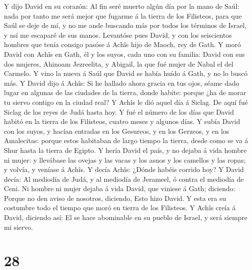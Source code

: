  Y dijo David en su corazón: Al fin seré muerto algún día
por la mano de Saúl: nada por tanto me será mejor que fugarme á la
tierra de los Filisteos, para que Saúl se deje de mí, y no me ande
buscando más por todos los términos de Israel, y así me escaparé de sus
manos.  Levantóse pues David, y con los seiscientos
hombres que tenía consigo pasóse á Achîs hijo de Maoch, rey de Gath.
 Y moró David con Achîs en Gath, él y los suyos, cada uno
con su familia: David con sus dos mujeres, Ahinoam Jezreelita, y
Abigail, la que fué mujer de Nabal el del Carmelo.  Y vino
la nueva á Saúl que David se había huído á Gath, y no lo buscó más.
 Y David dijo á Achîs: Si he hallado ahora gracia en tus
ojos, séame dado lugar en algunas de las ciudades de la tierra, donde
habite: porque ¿ha de morar tu siervo contigo en la ciudad real?
 Y Achîs le dió aquel día á Siclag. De aquí fué Siclag de
los reyes de Judá hasta hoy.  Y fué el número de los días
que David habitó en la tierra de los Filisteos, cuatro meses y algunos
días.  Y subía David con los suyos, y hacían entradas en
los Gesureos, y en los Gerzeos, y en los Amalecitas: porque estos
habitaban de largo tiempo la tierra, desde como se va á Shur hasta la
tierra de Egipto.  Y hería David el país, y no dejaba á
vida hombre ni mujer: y llevábase las ovejas y las vacas y los asnos y
los camellos y las ropas; y volvía, y veníase á Achîs.  Y
decía Achîs: ¿Dónde habéis corrido hoy? Y David decía: Al mediodía de
Judá, y al mediodía de Jerameel, ó contra el mediodía de Ceni.
 Ni hombre ni mujer dejaba á vida David, que viniese á
Gath; diciendo: Porque no den aviso de nosotros, diciendo, Esto hizo
David. Y esta era su costumbre todo el tiempo que moró en tierra de los
Filisteos.  Y Achîs creía á David, diciendo así: El se
hace abominable en su pueblo de Israel, y será siempre mi siervo.

\hypertarget{section-27}{%
\section{28}\label{section-27}}

